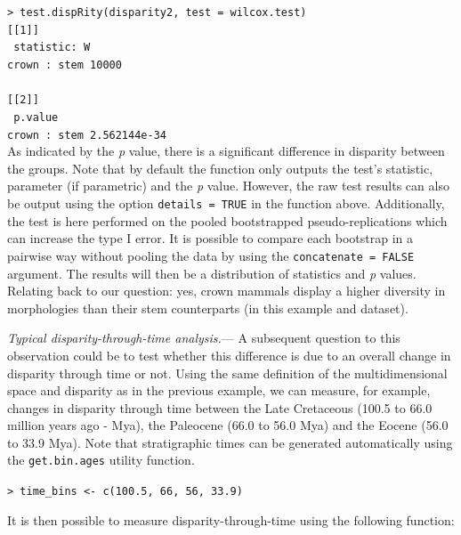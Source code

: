 \documentclass[12pt,letterpaper]{article}
\renewcommand{\subsubsection}[1]{%
\vspace{2ex}
\noindent
\textit{#1.}---}
\begin{document}
\noindent \texttt{> test.dispRity(disparity2, test = wilcox.test)}\\

\noindent \texttt{[[1]]}\\
\noindent \texttt{          statistic: W}\\
\noindent \texttt{crown : stem     10000}\\
\noindent \texttt{ }\\
\noindent \texttt{[[2]]}\\
\noindent \texttt{                  p.value}\\
\noindent \texttt{crown : stem 2.562144e-34}\\

\bigskip
As indicated by the \textit{p} value, there is a significant difference in disparity between the groups.
Note that by default the function only outputs the test's statistic, parameter (if parametric) and the \textit{p} value.
However, the raw test results can also be output using the option \texttt{details = TRUE} in the function above.
Additionally, the test is here performed on the pooled bootstrapped pseudo-replications which can increase the type I error.
It is possible to compare each bootstrap in a pairwise way without pooling the data by using the \texttt{concatenate = FALSE} argument.
The results will then be a distribution of statistics and \textit{p} values.
Relating back to our question: yes, crown mammals display a higher diversity in morphologies than their stem counterparts (in this example and dataset).

\subsubsection{Typical disparity-through-time analysis}
A subsequent question to this observation could be to test whether this difference is due to an overall change in disparity through time or not.
Using the same definition of the multidimensional space and disparity as in the previous example, we can measure, for example, changes in disparity through time between the Late Cretaceous (100.5 to 66.0 million years ago - Mya), the Paleocene (66.0 to 56.0 Mya) and the Eocene (56.0 to 33.9 Mya).
Note that stratigraphic times can be generated automatically using the \texttt{get.bin.ages} utility function.

\noindent
\texttt{> time\_bins <- c(100.5, 66, 56, 33.9)}

It is then possible to measure disparity-through-time using the following function:
\end{document}
